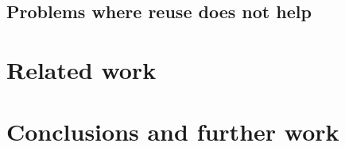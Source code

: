 \documentclass{article}
\theoremstyle{definition}
\begin{document}
\subsection{Problems where reuse does not help}



\section{Related work}



\section{Conclusions and further work}








\end{document}
